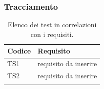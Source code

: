 %		
%		
%		
%		

	\subsubsection{Tracciamento}

	\begin{table}[H]
		\centering
		{\def\arraystretch{1.4}
		\begin{tabularx}{\textwidth}{YY}
			\textbf{Codice} & \textbf{Requisito} \\
			\toprule
			TS1 & requisito da inserire \\
			TS2 & requisito da inserire \\
			\bottomrule\\
		\end{tabularx}}
		\caption{Elenco dei test in correlazioni con i requisiti.}
	\end{table}
		


